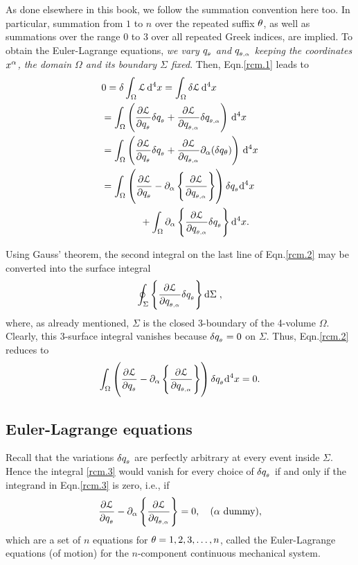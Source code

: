 As done elsewhere in this book, we  follow  the  summation 
convention here too. In particular,  summation from $1$ to 
$n$ over the repeated suffix ${\theta}$, as well as summations 
over the range $0$ to $3$ over all repeated Greek indices, 
are implied. To obtain the Euler-Lagrange equations, 
\textsl{we vary $q_{_{{\theta}}} $ and $q_{_{{\theta},{{\alpha}}}}$ keeping the 
coordinates $x^{{\alpha}}$, the domain $\Omega$ and  its boundary 
$\Sigma$ fixed}. Then, Eqn.\eqref{rcm.1} leads to
\begin{align}\label{rcm.2}
&0=\delta\int_{\Omega}\EuScript{L}\,\mathrm{d}^4 x
=\int_{\Omega}\delta\EuScript{L}\,\mathrm{d}^4x \notag\\&
=\int_{\Omega}\left(\frac{{\partial} \EuScript{L}}{{\partial}
q_{_{{\theta}}}  }\delta q_{_{{\theta}}}   +\frac{{\partial}
\EuScript{L}}{{\partial} q_{_{{\theta},{{\alpha}}}}}\delta q_{_{{\theta},{{\alpha}}}} \right)\,\mathrm{d}^4 x
\notag\\& = \int_{\Omega}
\left(\frac{{\partial} \EuScript{L}}{{\partial} q_{_{{\theta}}} } \delta q_{_{{\theta}}}   
+\frac{{\partial} \EuScript{L}}{{\partial}
q_{_{{\theta},{{\alpha}}}}}{\partial}_{{\alpha}} (\delta q_{{\theta}}) \right)\,\mathrm{d}^4 x
 \notag\\ & =\int_{\Omega}\left(\frac{{\partial} 
\EuScript{L}}{{\partial} q_{_{{\theta}}}  }
 -{\partial}_{{\alpha}}\left\{\frac{{\partial} \EuScript{L}}{{\partial}
q_{_{{\theta},{{\alpha}}}}}\right\}\right)\delta q_{_{{\theta}}}  \mathrm{d}^4
x \notag\\&\qquad\qquad+\int_{\Omega}{\partial}_{{\alpha}} 
\left\{\frac{{\partial} 
\EuScript{L}} {{\partial} q_{_{{\theta},{{\alpha}}}}}\delta q_{_{{\theta}}}  \right\}
\mathrm{d}^4 x.
\end{align}

Using Gauss' theorem, the second integral on the last line
of Eqn.\eqref{rcm.2}  may be converted into the surface 
integral
\begin{align*}
\oint_\Sigma \left\{\frac{{\partial} \EuScript{L}}{{\partial}
q_{_{{\theta},{{\alpha}}}}}\delta q_{_{{\theta}}}  \right\} \mathrm{d}\Sigma\;,
\end{align*}
where, as already mentioned,  $\Sigma$ is the closed 
3-boundary of the 4-volume $\Omega$. Clearly, this 
3-surface 
integral  vanishes because $\delta q_{_{{\theta}}}  =0$ on $\Sigma$. 
Thus, Eqn.\eqref{rcm.2} reduces to
\begin{align}\label{rcm.3}
\int_{\Omega}\left(\frac{{\partial} \EuScript{L}}{{\partial}
q_{_{{\theta}}}  } -{\partial}_{{\alpha}}\left\{\frac{{\partial}
\EuScript{L}}{{\partial}
q_{_{{\theta},{{\alpha}}}}}\right\}\right)\delta q_{_{{\theta}}}  \mathrm{d}^4 x=0.
\end{align}

\subsection{Euler-Lagrange equations}
Recall that the variations $\delta q_{_{{\theta}}} $ are perfectly 
arbitrary at  every event inside $\Sigma$. Hence  {the 
integral \eqref{rcm.3} would  vanish for every choice of 
$\delta q_{_{{\theta}}} $ if and only if the integrand in 
Eqn.\eqref{rcm.3} is zero}, i.e., if
\begin{align}\label{rcm.4}
\frac{{\partial} \EuScript{L}}{{\partial} q_{_{{\theta}}}  }
 -{\partial}_{{\alpha}}\left\{\frac{{\partial} \EuScript{L}}
 {{\partial} q_{_{{\theta},{{\alpha}}}}}\right\}=0,\quad({\alpha} \text{ dummy}),
\end{align}
which are a set of $n$ equations for ${\theta}=1,2,3,\dots,n$, 
called the {Euler-Lagrange equations (of motion) for 
the  $n$-component continuous mechanical system}.

